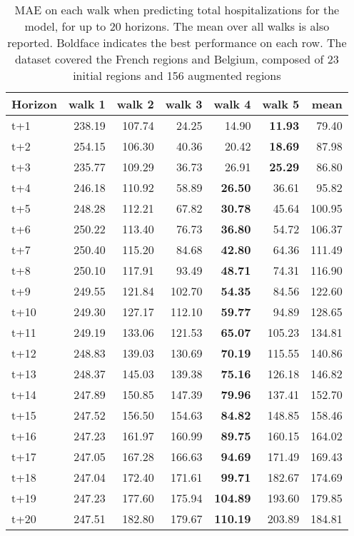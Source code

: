 \begin{table}[H]
\centering
\caption{MAE on each walk when predicting total hospitalizations for the model, for up to 20 horizons. The mean over all walks is also reported. Boldface indicates the best performance on each row. The dataset covered the French regions and Belgium, composed of 23 initial regions and 156 augmented regions }
\label{tab:MAE_walk_encoder_decoder}
\begin{tabular}{lrrrrrr}
\toprule
Horizon &  walk 1 &  walk 2 &  walk 3 &  walk 4 &  walk 5 &   mean \\
\midrule
t+1  & 238.19  & 107.74  & 24.25  & 14.90  & \textbf{11.93}  & 79.40  \\
t+2  & 254.15  & 106.30  & 40.36  & 20.42  & \textbf{18.69}  & 87.98  \\
t+3  & 235.77  & 109.29  & 36.73  & 26.91  & \textbf{25.29}  & 86.80  \\
t+4  & 246.18  & 110.92  & 58.89  & \textbf{26.50}  & 36.61  & 95.82  \\
t+5  & 248.28  & 112.21  & 67.82  & \textbf{30.78}  & 45.64  & 100.95  \\
t+6  & 250.22  & 113.40  & 76.73  & \textbf{36.80}  & 54.72  & 106.37  \\
t+7  & 250.40  & 115.20  & 84.68  & \textbf{42.80}  & 64.36  & 111.49  \\
t+8  & 250.10  & 117.91  & 93.49  & \textbf{48.71}  & 74.31  & 116.90  \\
t+9  & 249.55  & 121.84  & 102.70  & \textbf{54.35}  & 84.56  & 122.60  \\
t+10  & 249.30  & 127.17  & 112.10  & \textbf{59.77}  & 94.89  & 128.65  \\
t+11  & 249.19  & 133.06  & 121.53  & \textbf{65.07}  & 105.23  & 134.81  \\
t+12  & 248.83  & 139.03  & 130.69  & \textbf{70.19}  & 115.55  & 140.86  \\
t+13  & 248.37  & 145.03  & 139.38  & \textbf{75.16}  & 126.18  & 146.82  \\
t+14  & 247.89  & 150.85  & 147.39  & \textbf{79.96}  & 137.41  & 152.70  \\
t+15  & 247.52  & 156.50  & 154.63  & \textbf{84.82}  & 148.85  & 158.46  \\
t+16  & 247.23  & 161.97  & 160.99  & \textbf{89.75}  & 160.15  & 164.02  \\
t+17  & 247.05  & 167.28  & 166.63  & \textbf{94.69}  & 171.49  & 169.43  \\
t+18  & 247.04  & 172.40  & 171.61  & \textbf{99.71}  & 182.67  & 174.69  \\
t+19  & 247.23  & 177.60  & 175.94  & \textbf{104.89}  & 193.60  & 179.85  \\
t+20  & 247.51  & 182.80  & 179.67  & \textbf{110.19}  & 203.89  & 184.81  \\

\bottomrule
\end{tabular}
\end{table}
